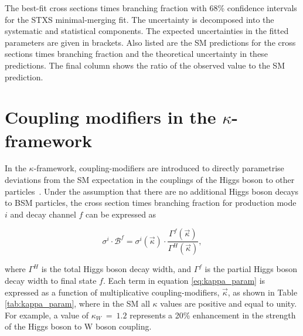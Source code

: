 \begin{table}
  \centering
  \scriptsize
  \renewcommand{\arraystretch}{1.8}
  \setlength{\tabcolsep}{2.2pt}
  \caption[Results of the minimal-merging fit]
  {
    The best-fit cross sections times branching fraction with 68\% confidence intervals for the STXS minimal-merging fit. The uncertainty is decomposed into the systematic and statistical components. The expected uncertainties in the fitted parameters are given in brackets. Also listed are the SM predictions for the cross sections times branching fraction and the theoretical uncertainty in these predictions. The final column shows the ratio of the observed value to the SM prediction.
  }
  \label{tab:stage1p2_minimal_results}
  \hspace*{-.5cm}
  
  \hspace*{-.5cm}
\end{table}

\FloatBarrier
\newpage
\section{Coupling modifiers in the $\kappa$-framework}\label{sec:results_kappa}
In the $\kappa$-framework, coupling-modifiers are introduced to directly parametrise deviations from the SM expectation in the couplings of the Higgs boson to other particles~\cite{Heinemeyer:2013tqa}. Under the assumption that there are no additional Higgs boson decays to BSM particles, the cross section times branching fraction for production mode $i$ and decay channel $f$ can be expressed as

\begin{equation}\label{eq:kappa_param}
    \sigma^i \cdot \mathcal{B}^f = \sigma^i(\vec{\kappa}) \cdot \frac{\Gamma^f(\vec{\kappa})}{\Gamma^H(\vec{\kappa})},
\end{equation}

\noindent
where $\Gamma^H$ is the total Higgs boson decay width, and $\Gamma^f$ is the partial Higgs boson decay width to final state $f$. Each term in equation \ref{eq:kappa_param} is expressed as a function of multiplicative coupling-modifiers, $\vec{\kappa}$, as shown in Table \ref{tab:kappa_param}, where in the SM all $\kappa$ values are positive and equal to unity. For example, a value of $\kappa_W~=~1.2$ represents a 20\% enhancement in the strength of the Higgs boson to W boson coupling.

